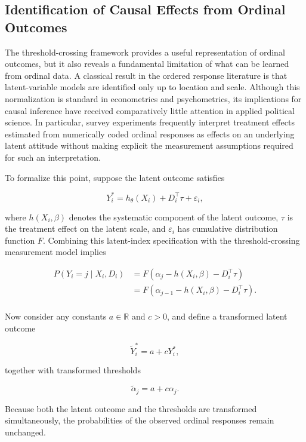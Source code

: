\documentclass{article}
\begin{document}
\subsection{Identification of Causal Effects from Ordinal Outcomes}
\label{subsec:identification}

The threshold-crossing framework provides a useful representation of ordinal outcomes, but it also reveals a fundamental limitation of what can be learned from ordinal data. A classical result in the ordered response literature is that latent-variable models are identified only up to location and scale. Although this normalization is standard in econometrics and psychometrics, its implications for causal inference have received comparatively little attention in applied political science. In particular, survey experiments frequently interpret treatment effects estimated from numerically coded ordinal responses as effects on an underlying latent attitude without making explicit the measurement assumptions required for such an interpretation.

To formalize this point, suppose the latent outcome satisfies

\begin{equation}
  Y_i^\ast = h_{\theta}(X_i) + D_i^\top\tau + \varepsilon_i,
\label{eq:latent}
\end{equation}

where $h(X_i,\beta)$ denotes the systematic component of the latent outcome, $\tau$ is the treatment effect on the latent scale, and $\varepsilon_i$ has cumulative distribution function $F$. Combining this latent-index specification with the threshold-crossing measurement model implies

\[
\begin{aligned}
  P(Y_i=j\mid X_i,D_i) &= F\left( \alpha_j-h(X_i,\beta)-D_i^\top\tau \right) \\
   &= F\left( \alpha_{j-1}-h(X_i,\beta)-D_i^\top\tau \right). \\
\end{aligned}
\]

Now consider any constants $a\in\mathbb{R}$ and $c>0$, and define a transformed latent outcome

\[
\tilde Y_i^\ast = a+cY_i^\ast,
\]

together with transformed thresholds

\[
\tilde\alpha_j = a+c\alpha_j.
\]

Because both the latent outcome and the thresholds are transformed simultaneously, the probabilities of the observed ordinal responses remain unchanged.
\end{document}
